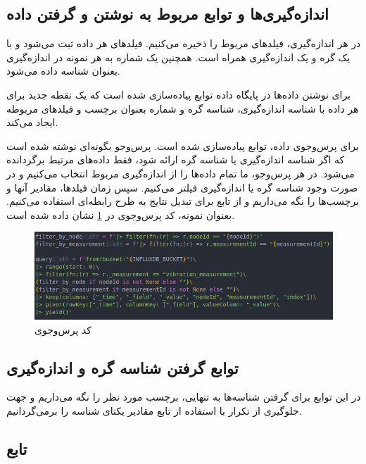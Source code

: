 \subsection{اندازه‌گیری‌ها و توابع مربوط به نوشتن و گرفتن داده}

در هر اندازه‌گیری، فیلدهای مربوط را ذخیره می‌کنیم. فیلدهای هر داده ثبت می‌شود و با یک گره و یک اندازه‌گیری همراه است. همچنین یک شماره به هر نمونه در اندازه‌گیری بعنوان شناسه داده می‌شود.

برای نوشتن داده‌ها در پایگاه داده توابع  پیاده‌سازی شده است که یک نقطه جدید برای هر داده با شناسه اندازه‌گیری، شناسه گره و شماره بعنوان برچسب و فیلدهای مربوطه ایجاد می‌کند.

برای پرس‌وجوی داده، توابع  پیاده‌سازی شده است. پرس‌وجو بگونه‌ای نوشته شده است که اگر شناسه اندازه‌گیری یا شناسه گره ارائه شود، فقط داده‌های مرتبط برگردانده می‌شود. در هر پرس‌وجو، ما تمام داده‌ها را از اندازه‌گیری مربوط انتخاب می‌کنیم و در صورت وجود شناسه گره یا اندازه‌گیری فیلتر می‌کنیم. سپس زمان فیلدها، مقادیر آنها و برچسب‌ها را نگه می‌داریم و از تابع  برای تبدیل نتایج به طرح رابطه‌ای استفاده می‌کنیم. بعنوان نمونه، کد پرس‌وجوی  در \cref{fig:vm_query} نشان داده شده است.

\begin{figure}[!h]
\centering\includegraphics[scale=.75]{vm_query.png}
\caption{کد پرس‌وجوی }\label{fig:vm_query}
\end{figure}

\subsection{توابع گرفتن شناسه گره و اندازه‌گیری}

در این توابع برای گرفتن شناسه‌ها به تنهایی، برچسب مورد نظر را نگه می‌داریم و جهت جلوگیری از تکرار با استفاده از تابع  مقادیر یکتای شناسه را برمی‌گردانیم.

\subsection{تابع }

